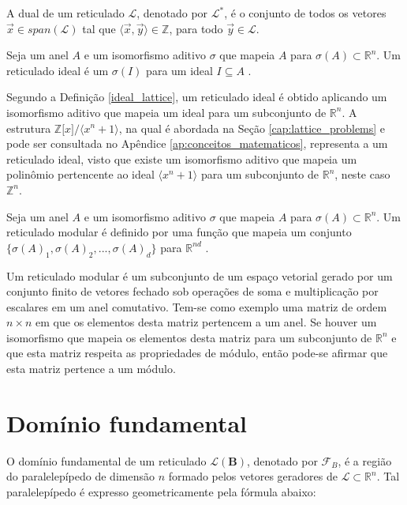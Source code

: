     \begin{definition}
        A dual de um reticulado $\mathcal{L}$, denotado por $\mathcal{L}^{*}$, é o conjunto de todos os vetores $\vec{x} \in span(\mathcal{L})$ tal que $\langle \vec{x},\vec{y} \rangle \in \mathbb{Z}$, para todo $\vec{y} \in \mathcal{L}$.
    \end{definition}

    \begin{definition}
    \label{ideal_lattice}
        Seja um anel $A$ e um isomorfismo aditivo $\sigma$ que mapeia $A$ para $\sigma (A) \subset \mathbb{R}^n$. Um reticulado ideal é um $\sigma(I)$ para um ideal $I \subseteq A$ \cite{ring_lwe}.
    \end{definition}

    Segundo a Definição \ref{ideal_lattice}, um reticulado ideal é obtido aplicando um isomorfismo aditivo que mapeia um ideal para um subconjunto de $\mathbb{R}^n$. A estrutura $\mathbb{Z}{[}x{]}/ \langle x^n + 1 \rangle$, na qual é abordada na Seção \ref{cap:lattice_problems} e pode ser consultada no Apêndice \ref{ap:conceitos_matematicos}, representa a um reticulado ideal, visto que existe um isomorfismo aditivo que mapeia um polinômio pertencente ao ideal $\langle x^n + 1 \rangle$ para um subconjunto de $\mathbb{R}^n$, neste caso $\mathbb{Z}^n$.

    \begin{definition}
    \label{modular_lattice}
        Seja um anel $A$ e um isomorfismo aditivo $\sigma$ que mapeia $A$ para $\sigma (A) \subset \mathbb{R}^n$. Um reticulado modular é definido por uma função que mapeia um conjunto $\{ \sigma(A)_1,\sigma(A)_2,...,\sigma(A)_d \}$ para $\mathbb{R}^{nd}$ \cite{module-lwe}. 
    \end{definition}

    Um reticulado modular é um subconjunto de um espaço vetorial gerado por um conjunto finito de vetores fechado sob operações de soma e multiplicação por escalares em um anel comutativo. Tem-se como exemplo uma matriz de ordem $n \times n$ em que os elementos desta matriz pertencem a um anel. Se houver um isomorfismo que mapeia os elementos desta matriz para um subconjunto de $\mathbb{R}^n$ e que esta matriz respeita as propriedades de módulo, então pode-se afirmar que esta matriz pertence a um módulo.

\section{Domínio fundamental}
    O domínio fundamental de um reticulado $\mathcal{L}(\textbf{B})$, denotado por $\mathcal{F}_B$, é a região do paralelepípedo de dimensão $n$ formado pelos vetores geradores de $\mathcal{L} \subset \mathbb{R}^{n}$. Tal paralelepípedo é expresso geometricamente pela fórmula abaixo: 

